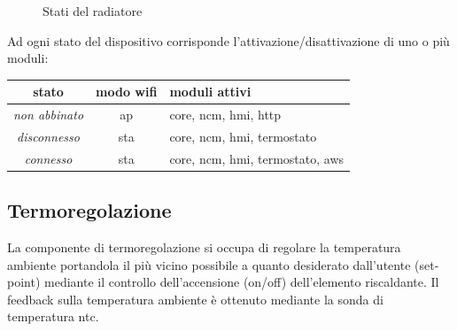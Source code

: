 \documentclass[12pt,a4paper,twoside,titlepage]{book}
\begin{document}
\begin{figure}[ht]
    \centering
    \caption{Stati del radiatore}
    \label{fig:stati}
\end{figure}

Ad ogni stato del dispositivo corrisponde l'attivazione/disattivazione di uno o più
moduli:

\begin{center}
\begin{tabular}{| c | c | l |}
    \hline
    stato & modo \Gls{wifi} & moduli attivi \\ \hline
    \textit{non abbinato} & \acrshort{ap} & core, \acrshort{ncm}, \acrshort{hmi}, \acrshort{http} \\ \hline
    \textit{disconnesso} & \acrshort{sta} & core, \acrshort{ncm}, \acrshort{hmi}, termostato \\ \hline
    \textit{connesso} & \acrshort{sta} & core, \acrshort{ncm}, \acrshort{hmi}, termostato, \acrshort{aws} \\ \hline
\end{tabular}
\end{center}

\subsection{Termoregolazione}

La componente di termoregolazione si occupa di regolare la temperatura ambiente portandola
il più vicino possibile a quanto desiderato dall'utente (set-point) mediante
il controllo dell'accensione (on/off) dell'elemento riscaldante. Il feedback sulla
temperatura ambiente è ottenuto mediante la sonda di temperatura \acrshort{ntc}.
\end{document}
